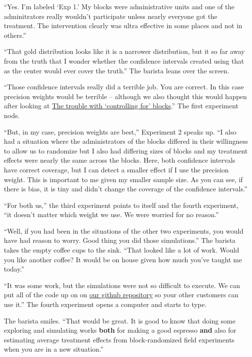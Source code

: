 \documentclass[
]{article}
\begin{document}
``Yes. I'm labeled `Exp 1.' My blocks were administrative units and one of the adminitrators really wouldn't participate unless nearly everyone got the treatment. The intervention clearly was ultra effective in some places and not in others.''

``That gold distribution looks like it is a narrower distribution, but it so far away from the truth that I wonder whether the confidence intervals created using that as the center would ever cover the truth.'' The barista leans over the screen.

``Those confidence intervals really did a terrible job. You are correct. In this case precision weights would be terrible -- although we also thought this would happen after looking at \href{https://declaredesign.org/blog/biased-fixed-effects.html}{The trouble with `controlling for' blocks}.'' The first experiment nods.

``But, in my case, precision weights are best,'' Experiment 2 speaks up. ``I also had a situation where the administrators of the blocks differed in their willingness to allow us to randomize but I also had differing sizes of blocks and my treatment effects were nearly the same across the blocks. Here, both confidence intervals have correct coverage, but I can detect a smaller effect if I use the precision weight. This is important to me given my smaller sample size. As you can see, if there is bias, it is tiny and didn't change the coverage of the confidence intervals.''

``For both us,'' the third experiment points to itself and the fourth experiment, ``it doesn't matter which weight we use. We were worried for no reason.''

``Well, if you had been in the situations of the other two experiments, you would have had reason to worry. Good thing you did those simulations.'' The barista takes the empty coffee cups to the sink. ``That looked like a lot of work. Would you like another coffee? It would be on house given how much you've taught me today.''

``It was some work, but the simulations were not so difficult to execute. We can put all of the code up on on \href{https://github.com/egap/standards_discussions/block_rand}{our github repository} so your other customers can use it.'' The fourth experiment opens a computer and starts to type.

The barista smiles. ``That would be great. It is good to know that doing some exploring and simulating works \textbf{both} for making a good espresso \textbf{and} also for estimating average treatment effects from block-randomized field experiments when you are in a new situation.''
\end{document}

